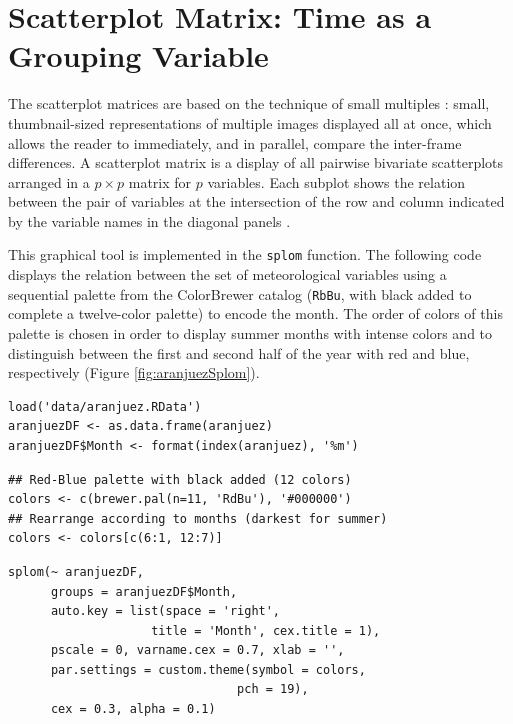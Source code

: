 
\section{Scatterplot Matrix: Time as a Grouping Variable \label{SEC:groupVariable}}
\label{sec:org74c8961}

The scatterplot matrices are based on the technique of small multiples
\cite{Tufte1990}: small, thumbnail-sized representations of multiple
images displayed all at once, which allows the reader to immediately,
and in parallel, compare the inter-frame differences.  A scatterplot
matrix is a display of all pairwise bivariate scatterplots arranged in
a \(p \times p\) matrix for \(p\) variables. Each subplot shows the
relation between the pair of variables at the intersection of the row
and column indicated by the variable names in the diagonal panels
\cite{Friendly.Denis2005}.

This graphical tool is implemented in the \texttt{splom} function. The
following code displays the relation between the set of
meteorological variables using a sequential palette from the
ColorBrewer catalog (\texttt{RbBu}, with black added to complete a
twelve-color palette) to encode the month. The order of colors of
this palette is chosen in order to display summer months with
intense colors and to distinguish between the first and second
half of the year with red and blue, respectively (Figure
\ref{fig:aranjuezSplom}).



\lstset{language=r,label= ,caption= ,captionpos=b,numbers=none}
\begin{lstlisting}
load('data/aranjuez.RData')
aranjuezDF <- as.data.frame(aranjuez)
aranjuezDF$Month <- format(index(aranjuez), '%m')
\end{lstlisting}

\lstset{language=r,label= ,caption= ,captionpos=b,numbers=none}
\begin{lstlisting}
## Red-Blue palette with black added (12 colors)
colors <- c(brewer.pal(n=11, 'RdBu'), '#000000')
## Rearrange according to months (darkest for summer)
colors <- colors[c(6:1, 12:7)]
\end{lstlisting}

\lstset{language=r,label= ,caption= ,captionpos=b,numbers=none}
\begin{lstlisting}
splom(~ aranjuezDF, 
      groups = aranjuezDF$Month,
      auto.key = list(space = 'right', 
                    title = 'Month', cex.title = 1),
      pscale = 0, varname.cex = 0.7, xlab = '',
      par.settings = custom.theme(symbol = colors,
                                pch = 19),
      cex = 0.3, alpha = 0.1)
\end{lstlisting}

